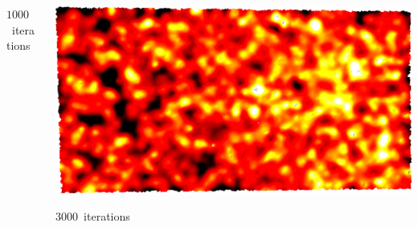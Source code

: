 \documentclass[aspectratio=169,t]{beamer}
\begin{document}
{\begin{columns}
\begin{column}{0.5\textwidth}
			{\footnotesize 
				\par \vspace{-1mm} $1000$~iterations
			}
		\end{column}
		\begin{column}{0.5\textwidth}
			\centering
			\includegraphics[width=.75\textwidth]{data/acquired_meshes/ILATO_1A_SM2066-HE5-60_070214_merged_GMO_r1_n4_v256_funcvals_3000iter.png}
			{\footnotesize 
				\par \vspace{-1mm} $3000$~iterations
			}
		\end{column}
	\end{columns}
}
\end{document}
